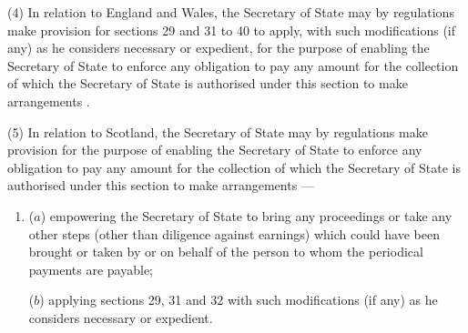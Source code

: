 \documentclass[12pt,a4paper]{article}
\begin{document}
(4) In relation to England and Wales, the Secretary of State may by regulations make provision for sections 29 and 31 to 40 to apply, with such modifications (if any) as he considers necessary or expedient, for the purpose of 
enabling the Secretary of State to enforce any obligation to pay any amount for the collection of which the Secretary of State is authorised under this section to make arrangements%
.

(5) In relation to Scotland, the Secretary of State may by regulations make provision for the purpose of 
enabling the Secretary of State to enforce any obligation to pay any amount for the collection of which the Secretary of State is authorised under this section to make arrangements%
—
\begin{enumerate}\item[]
($a$) empowering 
the 
Secretary of State  %
to bring any proceedings or take any other steps (other than diligence against earnings) which could have been brought or taken by or on behalf of the person to whom the periodical payments are payable;

($b$) applying sections 29, 31 and 32 with such modifications (if any) as he considers necessary or expedient.
\end{enumerate}

\end{document}
